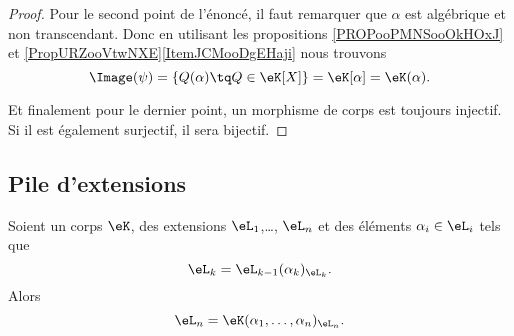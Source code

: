 \begin{proof}
    Pour le second point de l'énoncé, il faut remarquer que \( \alpha\) est algébrique et non transcendant. Donc en utilisant les propositions \ref{PROPooPMNSooOkHOxJ} et \ref{PropURZooVtwNXE}\ref{ItemJCMooDgEHaji} nous trouvons
    \begin{equation}
        \Image(\psi)=\{ Q(\alpha)\tq Q\in \eK[X] \}=\eK[\alpha]=\eK(\alpha).
    \end{equation}

    Et finalement pour le dernier point, un morphisme de corps est toujours injectif. Si il est également surjectif, il sera bijectif.
\end{proof}

\subsection{Pile d'extensions}

\begin{lemma}
    Soient un corps \( \eK\), des extensions \( \eL_1\),\ldots, \( \eL_n\) et des éléments \( \alpha_i\in \eL_i\) tels que
    \begin{equation}
        \eL_k=\eL_{k-1}(\alpha_k)_{\eL_k}.
    \end{equation}
    Alors
    \begin{equation}
        \eL_n=\eK(\alpha_1,\ldots, \alpha_n)_{\eL_n}.
    \end{equation}
\end{lemma}

